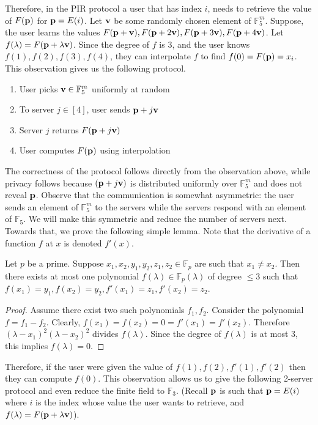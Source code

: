 Therefore, in the PIR protocol a user that has index $i$, needs to retrieve the value of $F(\mathbf{p})$ for $\mathbf{p}=E(i)$. Let $\mathbf{v}$ be some randomly chosen element of $\mathbb{F}_5^m$. Suppose, the user learns the values $F(\mathbf{p}+\mathbf{v}),F(\mathbf{p}+2\mathbf{v}),F(\mathbf{p}+3\mathbf{v}),F(\mathbf{p}+4\mathbf{v})$. Let $f(\lambda)=F(\mathbf{p}+\lambda \mathbf{v})$. Since the degree of $f$ is $3$, and the user knows $f(1),f(2),f(3),f(4)$, they can interpolate $f$ to find $f(0)=F(\mathbf{p})=x_i$. This observation gives us the following protocol.
\begin{enumerate}
    \item User picks $\mathbf{v}\in \mathbb{F}_5^m$ uniformly at random
    \item To server $j\in [4]$, user sends $\mathbf{p}+j\mathbf{v}$
    \item Server $j$ returns $F(\mathbf{p}+j\mathbf{v})$
    \item User computes $F(\mathbf{p})$ using interpolation
\end{enumerate}
The correctness of the protocol follows directly from the observation above, while privacy follows because $(\mathbf{p}+j\mathbf{v})$ is distributed uniformly over $\mathbb{F}_5^m$ and does not reveal $\mathbf{p}$.
Observe that the communication is somewhat asymmetric: the user sends an element of $\mathbb{F}_5^m$ to the servers while the servers respond with an element of $\mathbb{F}_5$. We will make this symmetric and reduce the number of servers next. Towards that, we prove the following simple lemma. Note that the derivative of a function $f$ at $x$ is denoted $f'(x)$.
\begin{lemma}
    Let $p$ be a prime. Suppose $x_1,x_2,y_1,y_2,z_1,z_2\in \mathbb{F}_p$ are such that $x_1\ne x_2$. Then there exists at most one polynomial $f(\lambda)\in \mathbb{F}_p(\lambda)$ of degree $\le 3$ such that $f(x_1)=y_1,f(x_2)=y_2,f'(x_1)=z_1,f'(x_2)=z_2$.
\end{lemma}
\begin{proof}
    Assume there exist two such polynomials $f_1,f_2$. Consider the polynomial $f=f_1-f_2$. Clearly, $f(x_1)=f(x_2)=0=f'(x_1)=f'(x_2)$. Therefore $(\lambda-x_1)^2(\lambda-x_2)^2$ divides $f(\lambda)$. Since the degree of $f(\lambda)$ is at most $3$, this implies $f(\lambda)=0$.
\end{proof}
Therefore, if the user were given the value of $f(1),f(2),f'(1),f'(2)$ then they can compute $f(0)$. This observation allows us to give the following 2-server protocol and even reduce the finite field to $\mathbb{F}_3$. (Recall $\mathbf{p}$ is such that $\mathbf{p}=E(i)$ where $i$ is the index whose value the user wants to retrieve, and $f(\lambda)=F(\mathbf{p}+\lambda \mathbf{v})$).
